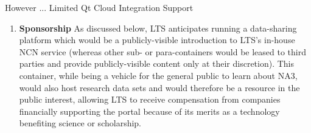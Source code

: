 \begin{frame}{}
{\begin{center}
\begin{minipage}{.9\textwidth}
{\begin{minipage}{\textwidth}
\begin{lightquadblock}{However ... Limited Qt Cloud Integration Support}
\begin{center}
\begin{minipage}{.98\textwidth}
{\begin{enumerate}
\item \textbf{Sponsorship}  \hspace{.5em} As discussed below, LTS anticipates 
running a data-sharing platform which would be a 
publicly-visible introduction to LTS's in-house 
NCN service (whereas other sub- or para-containers 
would be leased to third parties and provide 
publicly-visible content only at their discretion).  
This  container, while being a vehicle for 
the general public to learn about NA3, 
would also host research data sets and 
would therefore be a resource in the public 
interest, allowing LTS to receive compensation 
from companies financially supporting the 
portal because of its merits as a technology 
benefiting science or scholarship.
\end{enumerate}
}\end{minipage}
\end{center}
\end{lightquadblock}
\end{minipage}}


\end{minipage}
\end{center}
}

\end{frame}
